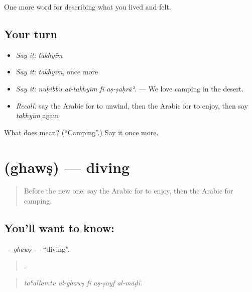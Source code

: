 \begin{grammarlens}[title={What you've built}]
One more word for describing what you lived and felt.
\end{grammarlens}

\subsection*{Your turn}
\begin{itemize}
\raggedright
  \item \emph{Say it:} \emph{takhyīm}
  \item \emph{Say it:} \emph{takhyīm}, once more
  \item \emph{Say it:} \emph{nuḥibbu at-takhyīm fī aṣ-ṣaḥrāʾ.} — We love camping in the desert.
  \item \emph{Recall:} say the Arabic for to unwind, then the Arabic for to enjoy, then say \emph{takhyīm} again
\end{itemize}

\begin{tcolorbox}[breakable,colback=teal!4,colframe=teal!35!black,title={Before you move on}]
What does  mean? (\textquotedblleft{}Camping\textquotedblright{}.) Say it once more.
\end{tcolorbox}
\section[\texorpdfstring{\ar{غوص} (ghawṣ)}{غوص (ghawṣ)}]{ (ghawṣ) — diving}

\label{lesson:AR-C537-ghaws}



\begin{quote}
Before the new one: say the Arabic for to enjoy, then the Arabic for camping.
\end{quote}

\subsection*{You'll want to know: }
\textbf{} — \emph{ghawṣ} — \textquotedblleft{}diving\textquotedblright{}.

\begin{quote}
    .
\end{quote}

\begin{quote}
\emph{taʿallamtu al-ghawṣ fī aṣ-ṣayf al-māḍī.}
\end{quote}

